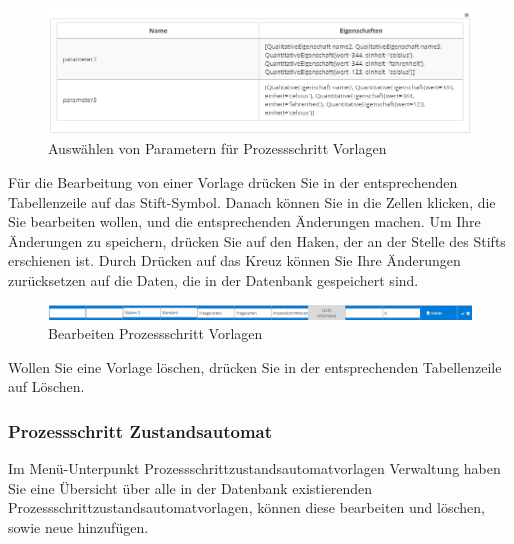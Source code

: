 \documentclass[enabledeprecatedfontcommands,fontsize=12pt,paper=a4,twoside]{scrartcl}
\begin{document}
\begin{figure}[h!]
\begin{center}
 \includegraphics[width=\textwidth]{screenshots/pk/prozessschrittvorlageparameter.png}
  \caption{Auswählen von Parametern für Prozessschritt Vorlagen}
  \label{fig:boat2}
\end{center}
\end{figure}

Für die Bearbeitung von einer Vorlage drücken Sie in der entsprechenden Tabellenzeile auf das Stift-Symbol. Danach können Sie in die Zellen klicken, die Sie bearbeiten wollen, und die entsprechenden Änderungen machen. Um Ihre Änderungen zu speichern, drücken Sie auf den Haken, der an der Stelle des Stifts erschienen ist. Durch Drücken auf das Kreuz können Sie Ihre Änderungen zurücksetzen auf die Daten, die in der Datenbank gespeichert sind. \\

\begin{figure}[h!]
\begin{center}
 \includegraphics[width=\textwidth]{screenshots/pk/prozessschrittvorlageedit.png}
  \caption{Bearbeiten Prozessschritt Vorlagen}
  \label{fig:boat2}
\end{center}
\end{figure}

Wollen Sie eine Vorlage löschen, drücken Sie in der entsprechenden Tabellenzeile auf Löschen. \\


\subsubsection{Prozessschritt Zustandsautomat}

Im Menü-Unterpunkt Prozessschrittzustandsautomatvorlagen Verwaltung haben Sie eine Übersicht über alle in der Datenbank existierenden Prozessschrittzustandsautomatvorlagen, können diese bearbeiten und löschen, sowie neue hinzufügen. \\
\end{document}

